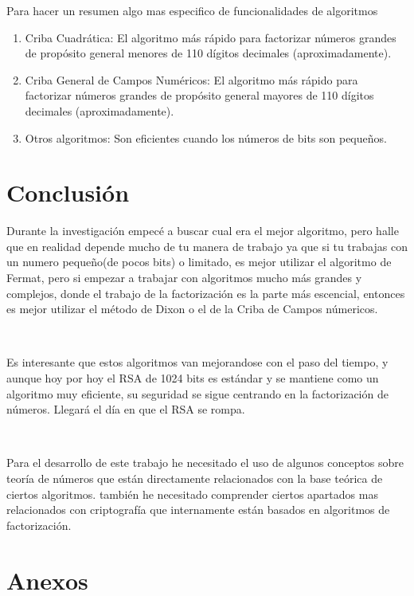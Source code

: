 \documentclass[11pt, conference]{IEEEtran}
\begin{document}
Para hacer un resumen algo mas especifico de funcionalidades de algoritmos
\begin{enumerate}
	\item Criba Cuadrática: El algoritmo más rápido para factorizar números grandes de propósito general menores de 110 dígitos decimales (aproximadamente).
	
	\item Criba General de Campos Numéricos: El algoritmo más rápido para factorizar números grandes de propósito general mayores de 110 dígitos decimales (aproximadamente).
	
	\item Otros algoritmos: Son eficientes cuando los números de bits son pequeños.
\end{enumerate}
\section{Conclusión}
Durante la investigación empecé a buscar cual era el mejor algoritmo, pero halle que en realidad depende mucho de tu manera de trabajo ya que si tu trabajas con un numero pequeño(de pocos bits) o limitado, es mejor utilizar el algoritmo de Fermat, pero si empezar a trabajar con algoritmos mucho más grandes y complejos, donde el trabajo de la factorización es la parte más escencial, entonces es mejor utilizar el método de Dixon o el de la Criba de Campos númericos. 

\

Es interesante que estos algoritmos van mejorandose con el paso del tiempo, y aunque hoy por hoy el RSA de 1024 bits es estándar y se mantiene como un algoritmo muy eficiente, su seguridad se sigue centrando en la factorización de números. Llegará el día en que el RSA se rompa.

\

Para el desarrollo de este trabajo he necesitado el uso de algunos conceptos sobre teoría de números que están directamente relacionados con la base teórica de ciertos algoritmos. también he necesitado comprender ciertos apartados mas relacionados con criptografía que internamente están basados en algoritmos de factorización.


\pagebreak
\section{Anexos}
\end{document}
